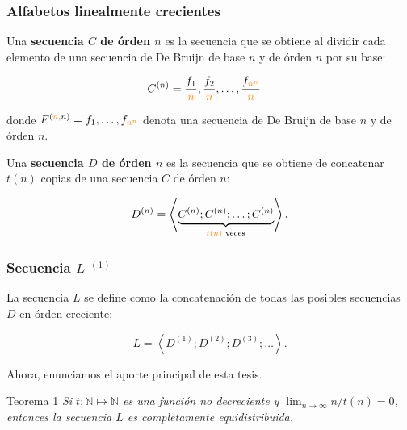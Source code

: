 \documentclass[t, 10pt, mathserif]{beamer}
\begin{document}
\begin{frame}
  \frametitle{Alfabetos linealmente crecientes}

  \vspace{-0.4cm}
  \begin{definition}
    Una \textbf{secuencia $C$ de órden $n$} es la secuencia que se obtiene al dividir cada elemento de una secuencia de De Bruijn de {\color{orange} base $n$} y de órden $n$ por su base:

    \vspace{-0.2cm}
    \begin{equation*}
      \begin{aligned}
        C^{(n)} & = \frac{f_1}{{\color{orange} n}}, \frac{f_2}{{\color{orange} n}}, \dots, \frac{f_{{\color{orange} n^n}}}{{\color{orange} n}}
      \end{aligned}
    \end{equation*}

    \vspace{-0.2cm}
    donde $F^{({\color{orange} n}, n)} = f_1, \dots, f_{{\color{orange} n^n}}$ denota una secuencia de De Bruijn de base $n$ y de órden $n$.

    Una \textbf{secuencia $D$ de órden $n$} es la secuencia que se obtiene de concatenar {\color{orange} $t(n)$ copias} de una secuencia $C$ de órden $n$:

    \vspace{-0.2cm}
    \begin{equation*}
      D^{(n)} = \left< \underbrace{C^{(n)} ; C^{(n)} ; \dots ; C^{(n)}}_{{\color{orange} t(n)} \text{ veces}} \right> \text{.}
    \end{equation*}
  \end{definition}
\end{frame}


\begin{frame}
  \frametitle{Secuencia $L$ {$^{(1)}$}}

  \begin{definition}
    La secuencia $L$ se define como la concatenación de todas las posibles secuencias $D$ en órden creciente:
    \pause

    \begin{equation*}
      L = \left< D^{(1)} ; D^{(2)} ;  D^{(3)} ; \dots \right> \text{.}
    \end{equation*}
  \end{definition}
  \pause

  {\color{orange} Ahora, enunciamos el aporte principal de esta tesis.}
  \pause

  \medskip
  \begin{block}{Teorema 1}
    \medskip
    \textit{Si $t : \mathbb{N} \mapsto \mathbb{N}$ es una función no decreciente y $\lim_{n \to \infty} n / t(n) = 0$, entonces la secuencia $L$ es completamente equidistribuida.}
  \end{block}
\end{frame}
\end{document}
